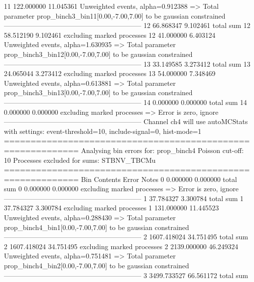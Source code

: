 11         122.000000      11.045361       Unweighted events, alpha=0.912388
  => Total parameter prop_binch3_bin11[0.00,-7.00,7.00] to be gaussian constrained
------------------------------------------------------------
12         66.868347       9.102461        total sum                     
12         58.512190       9.102461        excluding marked processes    
12         41.000000       6.403124        Unweighted events, alpha=1.630935
  => Total parameter prop_binch3_bin12[0.00,-7.00,7.00] to be gaussian constrained
------------------------------------------------------------
13         33.149585       3.273412        total sum                     
13         24.065044       3.273412        excluding marked processes    
13         54.000000       7.348469        Unweighted events, alpha=0.613881
  => Total parameter prop_binch3_bin13[0.00,-7.00,7.00] to be gaussian constrained
------------------------------------------------------------
14         0.000000        0.000000        total sum                     
14         0.000000        0.000000        excluding marked processes    
  => Error is zero, ignore      
------------------------------------------------------------
Channel ch4 will use autoMCStats with settings: event-threshold=10, include-signal=0, hist-mode=1
============================================================
Analysing bin errors for: prop_binch4
Poisson cut-off: 10
Processes excluded for sums: STBNV_TBCMu
============================================================
Bin        Contents        Error           Notes                         
0          0.000000        0.000000        total sum                     
0          0.000000        0.000000        excluding marked processes    
  => Error is zero, ignore      
------------------------------------------------------------
1          37.784327       3.300784        total sum                     
1          37.784327       3.300784        excluding marked processes    
1          131.000000      11.445523       Unweighted events, alpha=0.288430
  => Total parameter prop_binch4_bin1[0.00,-7.00,7.00] to be gaussian constrained
------------------------------------------------------------
2          1607.418024     34.751495       total sum                     
2          1607.418024     34.751495       excluding marked processes    
2          2139.000000     46.249324       Unweighted events, alpha=0.751481
  => Total parameter prop_binch4_bin2[0.00,-7.00,7.00] to be gaussian constrained
------------------------------------------------------------
3          3499.733527     66.561172       total sum                     
